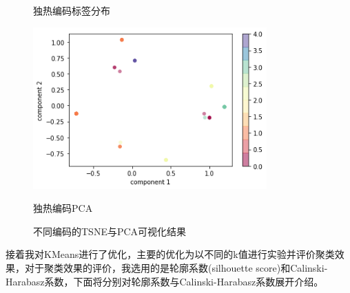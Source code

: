 \begin{figure}[htb]
\begin{minipage}[htb]{0.5\linewidth}
        \caption{独热编码标签分布}
    \end{minipage}
    \begin{minipage}[htb]{0.5\linewidth}
        \centering
        \includegraphics[width=0.8\textwidth]{images/Kmeans-5-PCA-one-hot.png}
        \caption{独热编码PCA}
    \end{minipage}
    \caption{不同编码的TSNE与PCA可视化结果}\label{Label-distribution-and-PCA} %
  \end{figure}

接着我对KMeans进行了优化，主要的优化为以不同的k值进行实验并评价聚类效果，对于聚类效果的评价，我选用的是轮廓系数(silhouette score)和Calinski-Harabasz系数，下面将分别对轮廓系数与Calinski-Harabasz系数展开介绍。


